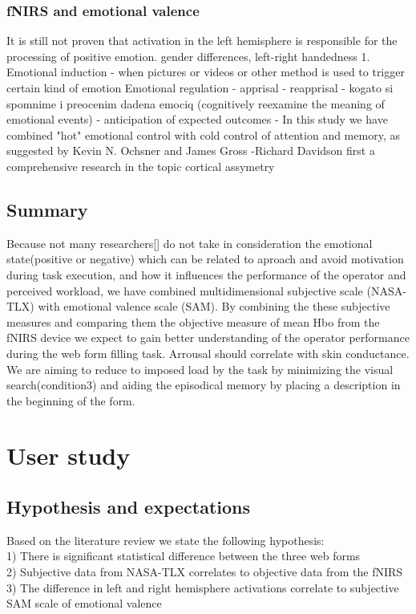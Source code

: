 \documentclass[a4paper]{report}
\begin{document}
		\subsection{fNIRS and emotional valence}
			It is still not proven that activation in the left hemisphere is responsible for the processing of positive emotion.
			gender differences, 
			left-right handedness
			1. Emotional induction - when pictures or videos or other method is used to trigger certain kind of emotion
			Emotional regulation
			- apprisal
			- reapprisal - kogato si spomnime i preocenim dadena emociq (cognitively reexamine the meaning of emotional events)
			- anticipation of expected outcomes 
			- In this study we have combined "hot" emotional control  with cold control of attention and memory, as suggested by Kevin N. Ochsner and James Gross \cite{the-cognitive-control-of-emotion}
			-Richard Davidson first a comprehensive research in the topic cortical assymetry
	\section{Summary}
		Because not many researchers[] do not take in consideration the emotional state(positive or negative) which can be related to aproach and avoid motivation during task execution, and how it influences the performance of the operator and perceived workload, we have combined multidimensional subjective scale (NASA-TLX) with emotional valence scale (SAM). By combining the these subjective measures and comparing them the objective measure of mean Hbo from the fNIRS device we expect to gain better understanding of the operator performance during the web form filling task.
		Arrousal should correlate with skin conductance.
		We are aiming to reduce to imposed load by the task by minimizing the visual search(condition3) and aiding the episodical memory by placing a description in the beginning of the form.
\chapter{User study}
	\section{Hypothesis and expectations}
	Based on the literature review we state the following hypothesis:\\
	1) There is significant statistical difference between the three web forms\\
	2) Subjective data from NASA-TLX correlates to objective data from the fNIRS\\
	3) The difference in left and right hemisphere activations correlate to subjective SAM scale of emotional valence\\	
\end{document}
